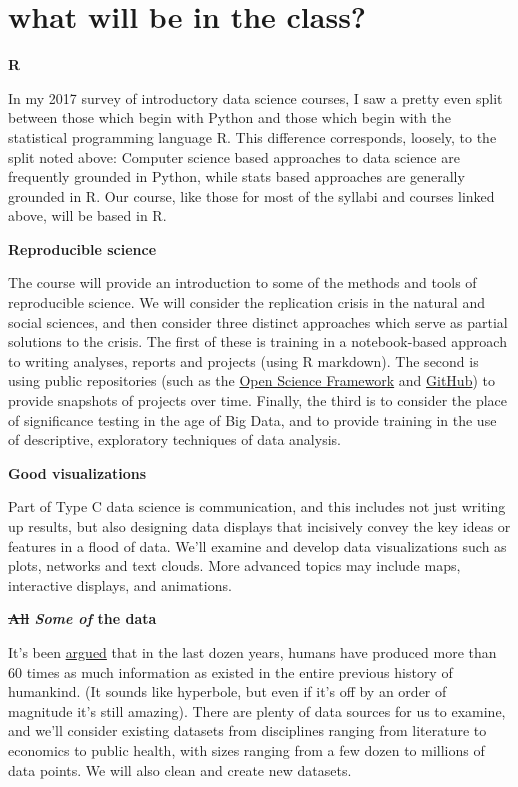 \documentclass[openany]{book}
\begin{document}
\hypertarget{what-will-be-in-the-class}{%
\section*{what will be in the class?}\label{what-will-be-in-the-class}}

\textbf{R}

In my 2017 survey of introductory data science courses, I saw a pretty even split between those which begin with Python and those which begin with the statistical programming language R. This difference corresponds, loosely, to the split noted above: Computer science based approaches to data science are frequently grounded in Python, while stats based approaches are generally grounded in R. Our course, like those for most of the syllabi and courses linked above, will be based in R.

\textbf{Reproducible science}

The course will provide an introduction to some of the methods and tools of reproducible science. We will consider the replication crisis in the natural and social sciences, and then consider three distinct approaches which serve as partial solutions to the crisis. The first of these is training in a notebook-based approach to writing analyses, reports and projects (using R markdown). The second is using public repositories (such as the \href{https://osf.io/}{Open Science Framework} and \href{https://github.com/}{GitHub}) to provide snapshots of projects over time. Finally, the third is to consider the place of significance testing in the age of Big Data, and to provide training in the use of descriptive, exploratory techniques of data analysis.

\textbf{Good visualizations}

Part of Type C data science is communication, and this includes not just writing up results, but also designing data displays that incisively convey the key ideas or features in a flood of data. We'll examine and develop data visualizations such as plots, networks and text clouds. More advanced topics may include maps, interactive displays, and animations.

\textbf{\sout{All} \emph{Some of} the data}

It's been \href{https://www.udemy.com/datascience/learn/v4/t/lecture/3473822?start=379}{argued} that in the last dozen years, humans have produced more than 60 times as much information as existed in the entire previous history of humankind. (It sounds like hyperbole, but even if it's off by an order of magnitude it's still amazing). There are plenty of data sources for us to examine, and we'll consider existing datasets from disciplines ranging from literature to economics to public health, with sizes ranging from a few dozen to millions of data points. We will also clean and create new datasets.
\end{document}

